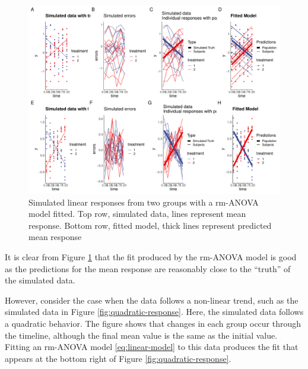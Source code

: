 \documentclass[
]{article}
\begin{document}
\begin{figure}
\centering
\includegraphics{Manuscript_AM_v2_files/figure-latex/linear-models-1.pdf}
\caption{\label{fig:linear-models}Simulated linear responses from two groups with a rm-ANOVA model fitted. Top row, simulated data, lines represent mean response. Bottom row, fitted model, thick lines represent predicted mean response}
\end{figure}

It is clear from Figure \ref{fig:linear-models} that the fit produced by the rm-ANOVA model is good as the predictions for the mean response are reasonably close to the ``truth'' of the simulated data.

However, consider the case when the data follows a non-linear trend, such as the simulated data in Figure \ref{fig:quadratic-response}. Here, the simulated data follows a quadratic behavior. The figure shows that changes in each group occur through the timeline, although the final mean value is the same as the initial value. Fitting an rm-ANOVA model \eqref{eq:linear-model} to this data produces the fit that appears at the bottom right of Figure \ref{fig:quadratic-response}.
\end{document}
